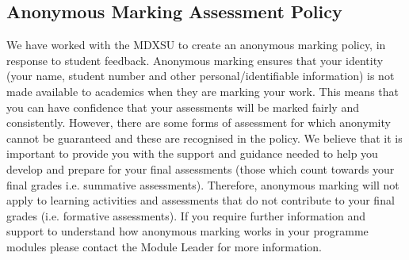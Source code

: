\documentclass{MDXHandbook}
\begin{document}
\begin{center}
\end{center}

\subsection*{Anonymous Marking Assessment Policy}
We have worked with the MDXSU to create an anonymous marking policy, in response to student feedback.  Anonymous marking ensures that your identity (your name, student number and other personal/identifiable information) is not made available to academics when they are marking your work.  This means that you can have confidence that your assessments will be marked fairly and consistently.  However, there are some forms of assessment for which anonymity cannot be guaranteed and these are recognised in the policy.  We believe that it is important to provide you with the support and guidance needed to help you develop and prepare for your final assessments (those which count towards your final grades i.e. summative assessments).  Therefore, anonymous marking will not apply to learning activities and assessments that do not contribute to your final grades (i.e. formative assessments).  If you require further information and support to understand how anonymous marking works in your programme modules please contact the Module Leader for more information.
\end{document}
